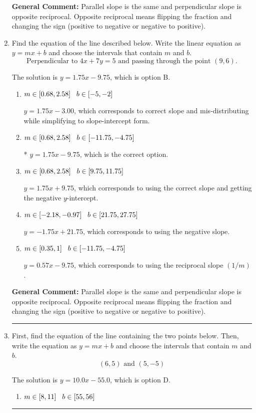 \documentclass{extbook}[14pt]
\newcommand{\litem}[1]{\item #1

\rule{\textwidth}{0.4pt}}
\begin{document}
\begin{enumerate}
{\textbf{General Comment:} Parallel slope is the same and perpendicular slope is opposite reciprocal. Opposite reciprocal means flipping the fraction and changing the sign (positive to negative or negative to positive).
}
\litem{
Find the equation of the line described below. Write the linear equation as $ y=mx+b $ and choose the intervals that contain $m$ and $b$.
\[ \text{Perpendicular to } 4 x + 7 y = 5 \text{ and passing through the point } (9, 6). \]

The solution is \( y = 1.75x - 9.75 \), which is option B.\begin{enumerate}[label=\Alph*.]
\item \( m \in [0.68, 2.58] \hspace*{3mm} b \in [-5, -2] \)

 $y = 1.75x - 3.00$, which corresponds to correct slope and mis-distributing while simplifying to slope-intercept form.
\item \( m \in [0.68, 2.58] \hspace*{3mm} b \in [-11.75, -4.75] \)

* $y = 1.75x - 9.75$, which is the correct option.
\item \( m \in [0.68, 2.58] \hspace*{3mm} b \in [9.75, 11.75] \)

 $y = 1.75x + 9.75$, which corresponds to using the correct slope and getting the negative $y$-intercept.
\item \( m \in [-2.18, -0.97] \hspace*{3mm} b \in [21.75, 27.75] \)

 $y = -1.75x + 21.75$, which corresponds to using the negative slope.
\item \( m \in [0.35, 1] \hspace*{3mm} b \in [-11.75, -4.75] \)

 $y = 0.57x - 9.75$, which corresponds to using the reciprocal slope $(1/m)$.
\end{enumerate}

\textbf{General Comment:} Parallel slope is the same and perpendicular slope is opposite reciprocal. Opposite reciprocal means flipping the fraction and changing the sign (positive to negative or negative to positive).
}
\litem{
First, find the equation of the line containing the two points below. Then, write the equation as $ y=mx+b $ and choose the intervals that contain $m$ and $b$.
\[ (6, 5) \text{ and } (5, -5) \]

The solution is \( y = 10.0x -55.0 \), which is option D.\begin{enumerate}[label=\Alph*.]
\item \( m \in [8, 11] \hspace*{3mm} b \in [55, 56] \)


\end{enumerate}}
\end{enumerate}
\end{document}
